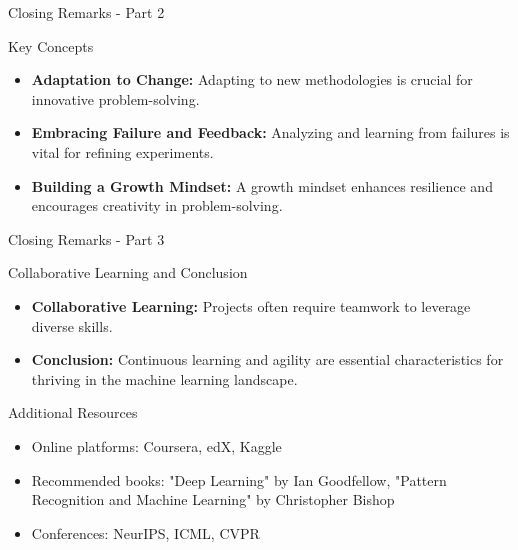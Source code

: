 \documentclass[aspectratio=169]{beamer}
\begin{document}
\begin{frame}[fragile]{Closing Remarks - Part 2}
  \begin{block}{Key Concepts}
    \begin{itemize}
      \item \textbf{Adaptation to Change:} 
        Adapting to new methodologies is crucial for innovative problem-solving.
      \item \textbf{Embracing Failure and Feedback:} 
        Analyzing and learning from failures is vital for refining experiments.
      \item \textbf{Building a Growth Mindset:} 
        A growth mindset enhances resilience and encourages creativity in problem-solving.
    \end{itemize}
  \end{block}
\end{frame}

\begin{frame}[fragile]{Closing Remarks - Part 3}
  \begin{block}{Collaborative Learning and Conclusion}
    \begin{itemize}
      \item \textbf{Collaborative Learning:} 
        Projects often require teamwork to leverage diverse skills.
      \item \textbf{Conclusion:} 
        Continuous learning and agility are essential characteristics for thriving in the machine learning landscape.
    \end{itemize}
  \end{block}
  \begin{block}{Additional Resources}
    \begin{itemize}
      \item Online platforms: Coursera, edX, Kaggle
      \item Recommended books: "Deep Learning" by Ian Goodfellow, "Pattern Recognition and Machine Learning" by Christopher Bishop
      \item Conferences: NeurIPS, ICML, CVPR
    \end{itemize}
  \end{block}
\end{frame}
\end{document}
